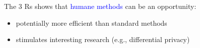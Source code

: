 \documentclass[aspectratio=169]{beamer}
\begin{document}
\begin{frame}

The 3 Rs shows that \textcolor{blue}{humane methods} can be an opportunity:
\pause
\begin{itemize}
\item potentially more efficient than standard methods
\pause
\item stimulates interesting research (e.g., differential privacy)
\end{itemize}

\end{frame}
\end{document}
